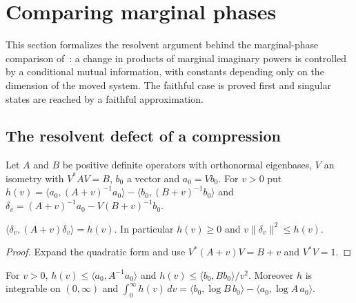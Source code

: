 
\section{Comparing marginal phases}
\label{ch:marginal_phase}

This section formalizes the resolvent argument behind the marginal-phase
comparison of~\cite[Lemma~5.2]{OpenAI2026AreaLaw}: a change in products of
marginal imaginary powers is controlled by a conditional mutual information,
with constants depending only on the dimension of the moved system. The
faithful case is proved first and singular states are reached by a faithful
approximation.

\subsection{The resolvent defect of a compression}

Let $A$ and $B$ be positive definite operators with orthonormal eigenbases,
$V$ an isometry with $V^*AV=B$, $b_0$ a vector and $a_0=Vb_0$. For $v>0$ put
$h(v)=\langle a_0,(A+v)^{-1}a_0\rangle-\langle b_0,(B+v)^{-1}b_0\rangle$ and
$\delta_v=(A+v)^{-1}a_0-V(B+v)^{-1}b_0$.

\begin{lemma}
    \label{lem:resolvent_compression}
    \leanok
    $\langle\delta_v,(A+v)\delta_v\rangle=h(v)$. In particular $h(v)\ge0$ and
    $v\lVert\delta_v\rVert^2\le h(v)$.
\end{lemma}

\begin{proof}\leanok
    Expand the quadratic form and use $V^*(A+v)V=B+v$ and $V^*V=1$.
\end{proof}

\begin{lemma}
    \label{lem:resolvent_defect_integral}
    \leanok
    For $v>0$, $h(v)\le\langle a_0,A^{-1}a_0\rangle$ and
    $h(v)\le\langle b_0,Bb_0\rangle/v^2$. Moreover $h$ is integrable on
    $(0,\infty)$ and
    $\int_0^\infty h(v)\,dv=\langle b_0,\log B\,b_0\rangle-\langle a_0,\log A\,a_0\rangle$.
\end{lemma}

